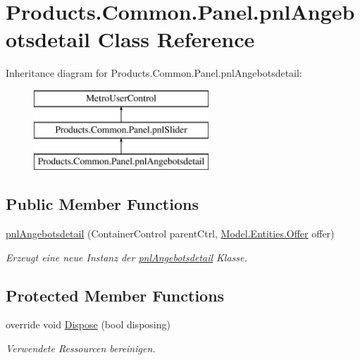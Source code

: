 \hypertarget{class_products_1_1_common_1_1_panel_1_1pnl_angebotsdetail}{}\section{Products.\+Common.\+Panel.\+pnl\+Angebotsdetail Class Reference}
\label{class_products_1_1_common_1_1_panel_1_1pnl_angebotsdetail}
Inheritance diagram for Products.\+Common.\+Panel.\+pnl\+Angebotsdetail\+:\begin{figure}[H]
\begin{center}
\leavevmode
\includegraphics[height=3.000000cm]{class_products_1_1_common_1_1_panel_1_1pnl_angebotsdetail}
\end{center}
\end{figure}
\subsection*{Public Member Functions}
\begin{DoxyCompactItemize}
\item 
\hyperlink{class_products_1_1_common_1_1_panel_1_1pnl_angebotsdetail_afb8ef8b32edb1bbb2c5fc63d51605d4c}{pnl\+Angebotsdetail} (Container\+Control parent\+Ctrl, \hyperlink{class_products_1_1_model_1_1_entities_1_1_offer}{Model.\+Entities.\+Offer} offer)
\begin{DoxyCompactList}\small\item\em Erzeugt eine neue Instanz der \hyperlink{class_products_1_1_common_1_1_panel_1_1pnl_angebotsdetail}{pnl\+Angebotsdetail} Klasse. \end{DoxyCompactList}\end{DoxyCompactItemize}
\subsection*{Protected Member Functions}
\begin{DoxyCompactItemize}
\item 
override void \hyperlink{class_products_1_1_common_1_1_panel_1_1pnl_angebotsdetail_ac840c74edf30ba00fd31a9a6aab9c40e}{Dispose} (bool disposing)
\begin{DoxyCompactList}\small\item\em Verwendete Ressourcen bereinigen. \end{DoxyCompactList}\end{DoxyCompactItemize}
